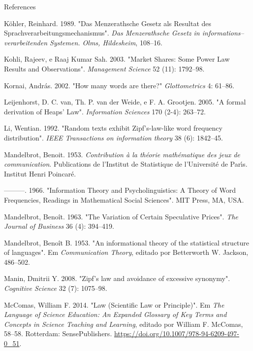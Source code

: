 \documentclass[
  ignorenonframetext,
  aspectratio=169]{beamer}
\newlength{\cslhangindent}
\newlength{\cslentryspacingunit} %
\newenvironment{CSLReferences}[2] %
 {%
  \setlength{\parindent}{0pt}
  \ifodd #1
  \let\oldpar\par
  \def\par{\hangindent=\cslhangindent\oldpar}
  \fi
  \setlength{\parskip}{#2\cslentryspacingunit}
 }%
 {}
\begin{document}
\begin{frame}[allowframebreaks]{References}
\begin{CSLReferences}{1}{0}
\leavevmode{}%
Köhler, Reinhard. 1989. {"Das Menzerathsche Gesetz als Resultat des
Sprachverarbeitungsmechanismus"}. \emph{Das Menzerathsche Gesetz in
informations--verarbeitenden Systemen. Olms, Hildesheim}, 108--16.

\leavevmode{}%
Kohli, Rajeev, e Raaj Kumar Sah. 2003. {"Market Shares: Some Power Law
Results and Observations"}. \emph{Management Science} 52 (11): 1792--98.

\leavevmode{}%
Kornai, András. 2002. {"How many words are there?"} \emph{Glottometrics}
4: 61--86.

\leavevmode{}%
Leijenhorst, D. C. van, Th. P. van der Weide, e F. A. Grootjen. 2005.
{"A formal derivation of {H}eaps' Law"}. \emph{Information Sciences} 170
(2-4): 263--72.

\leavevmode{}%
Li, Wentian. 1992. {"Random texts exhibit Zipf's-law-like word frequency
distribution"}. \emph{IEEE Transactions on information theory} 38 (6):
1842--45.

\leavevmode{}%
Mandelbrot, Benoit. 1953. \emph{Contribution {à} la th{é}orie
math{é}matique des jeux de communication}. Publications de l'Institut de
Statistique de l'Universit{é} de Par{ı́}s. Institut Henri Poincar{é}.

\leavevmode{}%
---------. 1966. {"Information Theory and Psycholinguistics: A Theory of
Word Frequencies, Readings in Mathematical Social Sciences"}. MIT Press,
MA, USA.

\leavevmode{}%
Mandelbrot, Benoît. 1963. {"The Variation of Certain Speculative
Prices"}. \emph{The Journal of Business} 36 (4): 394--419.

\leavevmode{}%
Mandelbrot, Benoît B. 1953. {"An informational theory of the statistical
structure of languages"}. Em \emph{Communication Theory}, editado por
Betterworth W. Jackson, 486--502.

\leavevmode{}%
Manin, Dmitrii Y. 2008. {"Zipf's law and avoidance of excessive
synonymy"}. \emph{Cognitive Science} 32 (7): 1075--98.

\leavevmode{}%
McComas, William F. 2014. {"Law (Scientific Law or Principle)"}. Em
\emph{The Language of Science Education: An Expanded Glossary of Key
Terms and Concepts in Science Teaching and Learning}, editado por
William F. McComas, 58--58. Rotterdam: SensePublishers.
\url{https://doi.org/10.1007/978-94-6209-497-0_51}.


\end{CSLReferences}
\end{frame}
\end{document}
